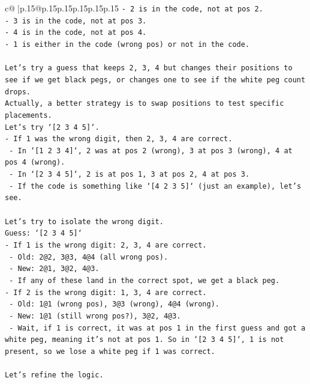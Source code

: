 \documentclass{article}
\begin{document}
{\begin{supertabular}{c@{$\;$}|p{.15\linewidth}@{}p{.15\linewidth}p{.15\linewidth}p{.15\linewidth}p{.15\linewidth}p{.15\linewidth}}
{{{\texttt{{-} 2 is in the code, not at pos 2.} \\
\texttt{{-} 3 is in the code, not at pos 3.} \\
\texttt{{-} 4 is in the code, not at pos 4.} \\
\texttt{{-} 1 is either in the code (wrong pos) or not in the code.} \\
\\ 
\texttt{Let's try a guess that keeps 2, 3, 4 but changes their positions to see if we get black pegs, or changes one to see if the white peg count drops.} \\
\texttt{Actually, a better strategy is to swap positions to test specific placements.} \\
\texttt{Let's try `{[}2 3 4 5{]}`.} \\
\texttt{{-} If 1 was the wrong digit, then 2, 3, 4 are correct.} \\
\texttt{  {-} In `{[}1 2 3 4{]}`, 2 was at pos 2 (wrong), 3 at pos 3 (wrong), 4 at pos 4 (wrong).} \\
\texttt{  {-} In `{[}2 3 4 5{]}`, 2 is at pos 1, 3 at pos 2, 4 at pos 3.} \\
\texttt{  {-} If the code is something like `{[}4 2 3 5{]}` (just an example), let's see.} \\
\\ 
\texttt{Let's try to isolate the wrong digit.} \\
\texttt{Guess: `{[}2 3 4 5{]}`} \\
\texttt{{-} If 1 is the wrong digit: 2, 3, 4 are correct.} \\
\texttt{  {-} Old: 2@2, 3@3, 4@4 (all wrong pos).} \\
\texttt{  {-} New: 2@1, 3@2, 4@3.} \\
\texttt{  {-} If any of these land in the correct spot, we get a black peg.} \\
\texttt{{-} If 2 is the wrong digit: 1, 3, 4 are correct.} \\
\texttt{  {-} Old: 1@1 (wrong pos), 3@3 (wrong), 4@4 (wrong).} \\
\texttt{  {-} New: 1@1 (still wrong pos?), 3@2, 4@3.} \\
\texttt{  {-} Wait, if 1 is correct, it was at pos 1 in the first guess and got a white peg, meaning it's not at pos 1. So in `{[}2 3 4 5{]}`, 1 is not present, so we lose a white peg if 1 was correct.} \\
\\ 
\texttt{Let's refine the logic.} \\
}}}
\end{supertabular}}
\end{document}
